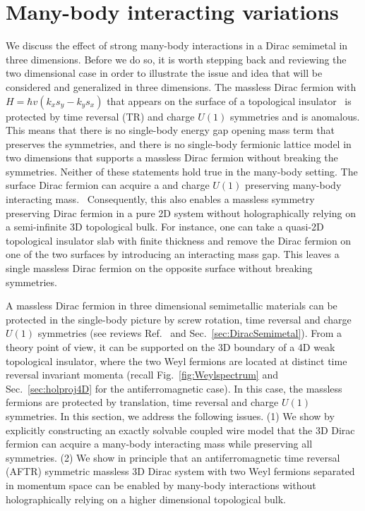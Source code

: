 \section{Many-body interacting variations}\label{sec:intenable}

We discuss the effect of strong many-body interactions in a Dirac semimetal in three dimensions. Before we do so, it is worth stepping back and reviewing the two dimensional case in order to illustrate the issue and idea that will be considered and generalized in three dimensions. The massless Dirac fermion with $H=\hbar v(k_xs_y-k_ys_x)$ that appears on the surface of a topological insulator~\cite{HasanKane10,QiZhangreview11,HasanMoore11,RMP} is protected by time reversal (TR) and charge $U(1)$ symmetries and is anomalous. This means that there is no single-body energy gap opening mass term that preserves the symmetries, and there is no single-body fermionic lattice model in two dimensions that supports a massless Dirac fermion without breaking the symmetries. Neither of these statements hold true in the many-body setting. The surface Dirac fermion can acquire a \TR and charge $U(1)$ preserving many-body interacting mass.~\cite{WangPotterSenthilgapTI13,ChenFidkowskiVishwanath14,MetlitskiKaneFisher13b,BondersonNayakQi13} Consequently, this also enables a massless symmetry preserving Dirac fermion in a pure 2D system without holographically relying on a semi-infinite 3D topological bulk. For instance, one can take a quasi-2D topological insulator slab with finite thickness and remove the Dirac fermion on one of the two surfaces by introducing an interacting mass gap. This leaves a single massless Dirac fermion on the opposite surface without breaking symmetries.

A massless Dirac fermion in three dimensional semimetallic materials can be protected in the single-body picture by screw rotation, time reversal and charge $U(1)$ symmetries (see reviews Ref.~\cite{Ashvin_Weyl_review,RMP,ArmitageMeleVishwanath16} and Sec.~\ref{sec:DiracSemimetal}). From a theory point of view, it can be supported on the 3D boundary of a 4D weak topological insulator, where the two Weyl fermions are located at distinct time reversal invariant momenta (recall Fig.~\ref{fig:Weylspectrum} and Sec.~\ref{sec:holproj4D} for the antiferromagnetic case). In this case, the massless fermions are protected by translation, time reversal and charge $U(1)$ symmetries. In this section, we address the following issues. (1) We show by explicitly constructing an exactly solvable coupled wire model that the 3D Dirac fermion can acquire a many-body interacting mass while preserving all symmetries. (2) We show in principle that an antiferromagnetic time reversal (AFTR) symmetric massless 3D Dirac system with two Weyl fermions separated in momentum space can be enabled by many-body interactions without holographically relying on a higher dimensional topological bulk.

